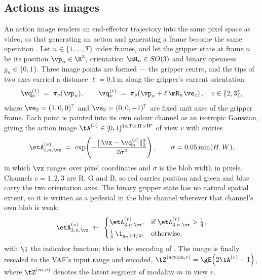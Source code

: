 \documentclass{article} %
\begin{document}
\subsection{Actions as images}
\label{sec:actionimages}

An action image renders an end-effector trajectory into the same pixel space as video, so that
generating an action and generating a frame become the same operation \citep{zhen2026action}. Let
$n\in\{1,\dots,T\}$ index frames, and let the gripper state at frame $n$ be its position
$\vp_n\in\R^3$, orientation $\mR_n\in SO(3)$ and binary openness $g_n\in\{0,1\}$. Three image
points are formed --- the gripper centre, and the tips of two axes carried a distance
$\ell=0.1$\,m along the gripper's current orientation:
\begin{equation}
\vq^{(1)}_n \;=\; \pi_v(\vp_n),
\qquad
\vq^{(c)}_n \;=\; \pi_v\!\left(\vp_n + \ell\,\mR_n\ve_c\right),\quad c\in\{2,3\},
\label{eq:actionpoints}
\end{equation}
where $\ve_2=(1,0,0)^{\!\top}$ and $\ve_3=(0,0,-1)^{\!\top}$ are fixed unit axes of the gripper
frame. Each point is painted into its own colour channel as an isotropic Gaussian, giving the
action image $\tA^{(v)}\in[0,1]^{3\times T\times H\times W}$ of view $v$ with entries
\begin{equation}
\etA^{(v)}_{c,n,\vx} \;=\; \exp\!\left(-\frac{\|\vx-\vq^{(c)}_n\|_2^2}{2\sigma^2}\right),
\qquad \sigma = 0.05\min(H,W),
\label{eq:actionimage}
\end{equation}
in which $\vx$ ranges over pixel coordinates and $\sigma$ is the blob width in pixels. Channels
$c=1,2,3$ are R, G and B, so red carries position and green and blue carry the two orientation
axes. The binary gripper state has no natural spatial extent, so it is written as a pedestal in
the blue channel wherever that channel's own blob is weak:
\begin{equation}
\etA^{(v)}_{3,n,\vx} \;\leftarrow\;
\begin{cases}
\etA^{(v)}_{3,n,\vx}, & \text{if } \etA^{(v)}_{3,n,\vx} > \tfrac14,\\[2pt]
\tfrac14\,\1_{g_n > 1/2}, & \text{otherwise},
\end{cases}
\label{eq:openness}
\end{equation}
with $\1$ the indicator function; this is the encoding of \citet[Eq.~7]{zhen2026action}. The image
is finally rescaled to the VAE's input range and encoded,
$\tZ^{(\mathrm{action},v)} = \gE\!\left(2\tA^{(v)}-1\right)$, where $\tZ^{(m,v)}$ denotes the
latent segment of modality $m$ in view $v$.
\end{document}
